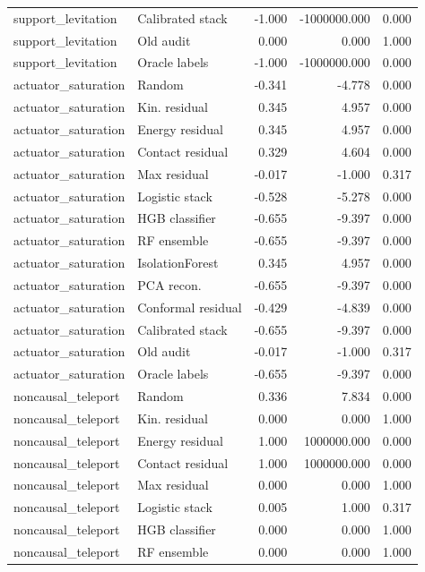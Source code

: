 {\begin{longtable}{llrrr}
support\_levitation & Calibrated stack & -1.000 & -1000000.000 & 0.000 \\
support\_levitation & Old audit & 0.000 & 0.000 & 1.000 \\
support\_levitation & Oracle labels & -1.000 & -1000000.000 & 0.000 \\
actuator\_saturation & Random & -0.341 & -4.778 & 0.000 \\
actuator\_saturation & Kin. residual & 0.345 & 4.957 & 0.000 \\
actuator\_saturation & Energy residual & 0.345 & 4.957 & 0.000 \\
actuator\_saturation & Contact residual & 0.329 & 4.604 & 0.000 \\
actuator\_saturation & Max residual & -0.017 & -1.000 & 0.317 \\
actuator\_saturation & Logistic stack & -0.528 & -5.278 & 0.000 \\
actuator\_saturation & HGB classifier & -0.655 & -9.397 & 0.000 \\
actuator\_saturation & RF ensemble & -0.655 & -9.397 & 0.000 \\
actuator\_saturation & IsolationForest & 0.345 & 4.957 & 0.000 \\
actuator\_saturation & PCA recon. & -0.655 & -9.397 & 0.000 \\
actuator\_saturation & Conformal residual & -0.429 & -4.839 & 0.000 \\
actuator\_saturation & Calibrated stack & -0.655 & -9.397 & 0.000 \\
actuator\_saturation & Old audit & -0.017 & -1.000 & 0.317 \\
actuator\_saturation & Oracle labels & -0.655 & -9.397 & 0.000 \\
noncausal\_teleport & Random & 0.336 & 7.834 & 0.000 \\
noncausal\_teleport & Kin. residual & 0.000 & 0.000 & 1.000 \\
noncausal\_teleport & Energy residual & 1.000 & 1000000.000 & 0.000 \\
noncausal\_teleport & Contact residual & 1.000 & 1000000.000 & 0.000 \\
noncausal\_teleport & Max residual & 0.000 & 0.000 & 1.000 \\
noncausal\_teleport & Logistic stack & 0.005 & 1.000 & 0.317 \\
noncausal\_teleport & HGB classifier & 0.000 & 0.000 & 1.000 \\
noncausal\_teleport & RF ensemble & 0.000 & 0.000 & 1.000 \\

\end{longtable}}
